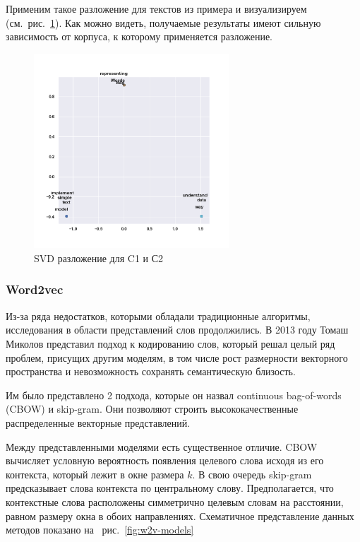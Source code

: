 Применим такое разложение для текстов из примера и визуализируем (см.~рис.~\ref{fig:svd-example}).
Как можно видеть, получаемые результаты имеют сильную зависимость от корпуса, к которому применяется разложение.

\begin{figure}[h]
\centering
\includegraphics[width=0.65\textwidth]{img/svd-example.png}
\caption{\label{fig:svd-example}SVD разложение для C1 и С2}
\end{figure}

\subsubsection{Word2vec}

Из-за ряда недостатков, которыми обладали традиционные алгоритмы, исследования в области представлений слов продолжились. В 2013 году Томаш Миколов представил подход \autocite{DBLP:journals/corr/abs-1301-3781} к кодированию слов, который решал целый ряд проблем, присущих другим моделям, в том числе рост размерности векторного пространства и невозможность сохранять семантическую близость.

Им было представлено 2 подхода, которые он назвал continuous bag-of-words (CBOW) и skip-gram. Они позволяют строить высококачественные распределенные векторные представлений.

Между представленными моделями есть существенное отличие. CBOW вычисляет условную вероятность появления целевого слова исходя из его контекста,  который лежит в окне размера $k$. В свою очередь skip-gram предсказывает слова контекста по центральному слову. Предполагается, что контекстные слова расположены симметрично целевым словам на расстоянии, равном размеру окна в обоих направлениях. Схематичное представление данных методов показано на ~рис.~\ref{fig:w2v-models}

